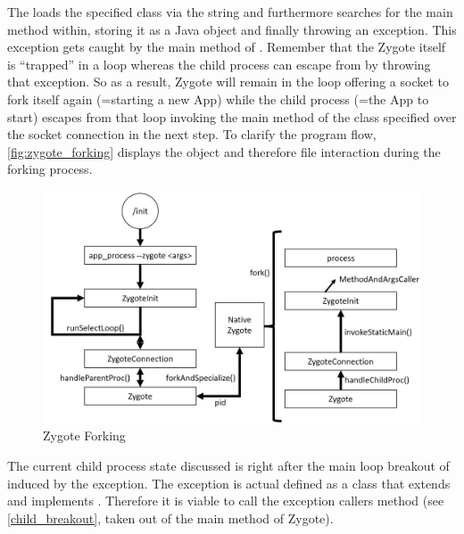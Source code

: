 The  loads the specified class via the  string and furthermore searches for the main method within, storing it as a Java  object and finally throwing an
 exception. This exception gets caught by the main method of .
Remember that the Zygote itself is ``trapped'' in a loop whereas the child process can escape from by throwing that exception. So as a result, Zygote will remain in the loop offering a socket to fork itself again (=starting a new App) while the child process (=the App to start) escapes from that loop invoking the main method of the class specified over the socket
connection in the next step.
To clarify the program flow, \autoref{fig:zygote_forking} displays
the object and therefore file interaction during the forking process.

\begin{figure}[htb]
  \centering
  \includegraphics[width={\textwidth}]{figures/zygote_forking}
  \caption[Zygote Forking]{Zygote Forking}
  \label{fig:zygote_forking}
\end{figure}


The current child process state discussed is right after the main loop
breakout of  induced by the exception. The exception
is actual defined as a class that extends  and implements
. Therefore it is viable to call the exception callers
 method (see \autoref{child_breakout}, taken out of the main
method of Zygote).




